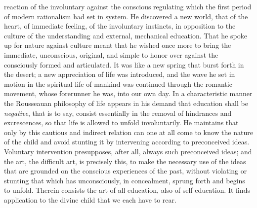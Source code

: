 \documentclass[12pt,a4paper,openany]{book}
\begin{document}
reaction of the involuntary against the conscious regulating which
the first period of modern rationalism had set in system.
He discovered a new world, that of the heart, of immediate
feeling, of the involuntary instincts, in opposition to
the culture of the understanding and external, mechanical
education. That he spoke up for nature against culture meant that
he wished once more to bring the immediate, unconscious, original, and
simple to honor over against the consciously formed and articulated.
It was like a new spring that burst forth in the desert; a new
appreciation of life was introduced, and the wave he set in
motion in the spiritual life of mankind was continued through
the romantic movement, whose forerunner he was, into
our own day. In a characteristic manner the
Rousseauan philosophy of life appears in his demand that education shall
be \emph{negative}, that is to say, consist essentially in the removal
of hindrances and excrescences, so that life is allowed to unfold
involuntarily. He maintains that only by this cautious
and indirect relation can one at all come to know the nature of the child
and avoid stunting it by intervening according to
preconceived ideas. Voluntary intervention presupposes, after all,
always such preconceived ideas; and the art, the difficult
art, is precisely this, to make the necessary use of the ideas
that are grounded on the conscious experiences of the past, without violating
or stunting that which has unconsciously, in concealment, sprung forth
and begins to unfold. Therein consists the art of all education,
also of self-education. It finds application to the
divine child that we each have to rear.
\end{document}
